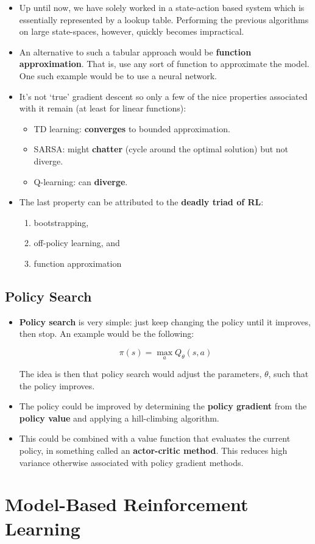 \documentclass[
]{book}
\providecommand{\tightlist}{%
  \setlength{\itemsep}{0pt}\setlength{\parskip}{0pt}}
\begin{document}
\begin{itemize}
\item
  Up until now, we have solely worked in a state-action based system
  which is essentially represented by a lookup table. Performing the
  previous algorithms on large state-spaces, however, quickly becomes
  impractical.
\item
  An alternative to such a tabular approach would be \textbf{function
  approximation}. That is, use any sort of function to approximate the
  model. One such example would be to use a neural network.
\item
  It's not `true' gradient descent so only a few of the nice properties
  associated with it remain (at least for linear functions):

  \begin{itemize}
  \tightlist
  \item
    TD learning: \textbf{converges} to bounded approximation.
  \item
    SARSA: might \textbf{chatter} (cycle around the optimal solution)
    but not diverge.
  \item
    Q-learning: can \textbf{diverge}.
  \end{itemize}
\item
  The last property can be attributed to the \textbf{deadly triad of
  RL}:

  \begin{enumerate}
  \def\labelenumi{\arabic{enumi}.}
  \tightlist
  \item
    bootstrapping,
  \item
    off-policy learning, and
  \item
    function approximation
  \end{enumerate}
\end{itemize}

\hypertarget{policy-search}{%
\subsection{Policy Search}\label{policy-search}}

\begin{itemize}
\item
  \textbf{Policy search} is very simple: just keep changing the policy
  until it improves, then stop. An example would be the following:

  \[
  \pi(s)=\operatorname*{max}_{a}Q_{\theta}(s,a)
  \]

  The idea is then that policy search would adjust the parameters,
  \(\theta\), such that the policy improves.
\item
  The policy could be improved by determining the \textbf{policy
  gradient} from the \textbf{policy value} and applying a hill-climbing
  algorithm.
\item
  This could be combined with a value function that evaluates the
  current policy, in something called an \textbf{actor-critic method}.
  This reduces high variance otherwise associated with policy gradient
  methods.
\end{itemize}

\hypertarget{model-based-reinforcement-learning}{%
\section{Model-Based Reinforcement
Learning}\label{model-based-reinforcement-learning}}

\backmatter
\end{document}
